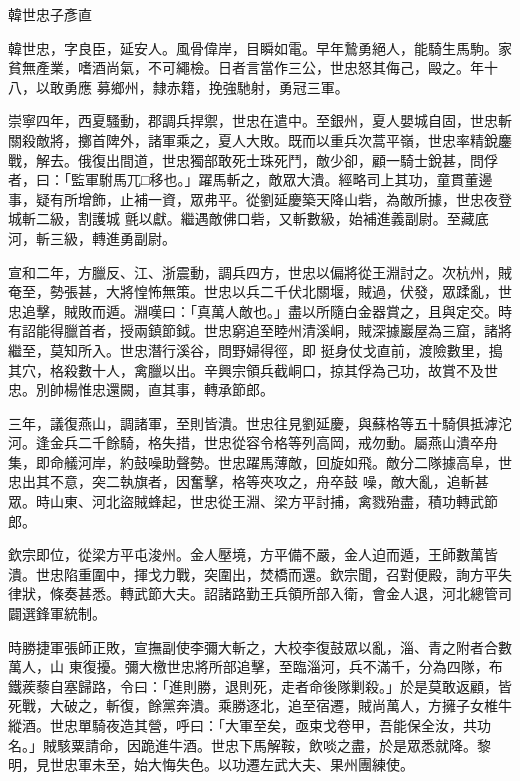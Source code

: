 
\begin{pinyinscope}

 韓世忠子彥直



 韓世忠，字良臣，延安人。風骨偉岸，目瞬如電。早年鷙勇絕人，能騎生馬駒。家貧無產業，嗜酒尚氣，不可繩檢。日者言當作三公，世忠怒其侮己，毆之。年十八，以敢勇應
 募鄉州，隸赤籍，挽強馳射，勇冠三軍。



 崇寧四年，西夏騷動，郡調兵捍禦，世忠在遣中。至銀州，夏人嬰城自固，世忠斬關殺敵將，擲首陴外，諸軍乘之，夏人大敗。既而以重兵次蒿平嶺，世忠率精銳鏖戰，解去。俄復出間道，世忠獨部敢死士珠死鬥，敵少卻，顧一騎士銳甚，問俘者，曰：「監軍駙馬兀□移也。」躍馬斬之，敵眾大潰。經略司上其功，童貫董邊事，疑有所增飾，止補一資，眾弗平。從劉延慶築天降山砦，為敵所據，世忠夜登城斬二級，割護城
 氈以獻。繼遇敵佛口砦，又斬數級，始補進義副尉。至藏底河，斬三級，轉進勇副尉。



 宣和二年，方臘反、江、浙震動，調兵四方，世忠以偏將從王淵討之。次杭州，賊奄至，勢張甚，大將惶怖無策。世忠以兵二千伏北關堰，賊過，伏發，眾蹂亂，世忠追擊，賊敗而遁。淵嘆曰：「真萬人敵也。」盡以所隨白金器賞之，且與定交。時有詔能得臘首者，授兩鎮節鉞。世忠窮追至睦州清溪峒，賊深據巖屋為三窟，諸將繼至，莫知所入。世忠潛行溪谷，問野婦得徑，即
 挺身仗戈直前，渡險數里，搗其穴，格殺數十人，禽臘以出。辛興宗領兵截峒口，掠其俘為己功，故賞不及世忠。別帥楊惟忠還闕，直其事，轉承節郎。



 三年，議復燕山，調諸軍，至則皆潰。世忠往見劉延慶，與蘇格等五十騎俱抵滹沱河。逢金兵二千餘騎，格失措，世忠從容令格等列高岡，戒勿動。屬燕山潰卒舟集，即命艤河岸，約鼓噪助聲勢。世忠躍馬薄敵，回旋如飛。敵分二隊據高阜，世忠出其不意，突二執旗者，因奮擊，格等夾攻之，舟卒鼓
 噪，敵大亂，追斬甚眾。時山東、河北盜賊蜂起，世忠從王淵、梁方平討捕，禽戮殆盡，積功轉武節郎。



 欽宗即位，從梁方平屯浚州。金人壓境，方平備不嚴，金人迫而遁，王師數萬皆潰。世忠陷重圍中，揮戈力戰，突圍出，焚橋而還。欽宗聞，召對便殿，詢方平失律狀，條奏甚悉。轉武節大夫。詔諸路勤王兵領所部入衛，會金人退，河北總管司闢選鋒軍統制。



 時勝捷軍張師正敗，宣撫副使李彌大斬之，大校李復鼓眾以亂，淄、青之附者合數萬人，山
 東復擾。彌大檄世忠將所部追擊，至臨淄河，兵不滿千，分為四隊，布鐵蒺藜自塞歸路，令曰：「進則勝，退則死，走者命後隊剿殺。」於是莫敢返顧，皆死戰，大破之，斬復，餘黨奔潰。乘勝逐北，追至宿遷，賊尚萬人，方擁子女椎牛縱酒。世忠單騎夜造其營，呼曰：「大軍至矣，亟束戈卷甲，吾能保全汝，共功名。」賊駭粟請命，因跪進牛酒。世忠下馬解鞍，飲啖之盡，於是眾悉就降。黎明，見世忠軍未至，始大悔失色。以功遷左武大夫、果州團練使。




\end{pinyinscope}
